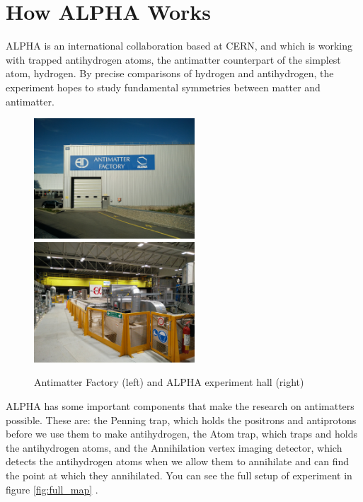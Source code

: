 \documentclass{article}
\begin{document}
\newpage

\tableofcontents

\newpage

\section{How ALPHA Works}

ALPHA is an international collaboration based at CERN, and which is working with trapped antihydrogen atoms, the antimatter counterpart of the simplest atom, hydrogen. By precise comparisons of hydrogen and antihydrogen, the experiment hopes to study fundamental symmetries between matter and antimatter. 

\begin{figure}[h]

\includegraphics[width=60mm]{antimatter_factory}
\includegraphics[width=60mm]{alpha_hall}

\caption{Antimatter Factory (left) and ALPHA experiment hall (right)}
\end{figure}

ALPHA has some important components that make the research on antimatters possible. These are: the Penning trap, which holds the positrons and antiprotons before we use them to make antihydrogen, the Atom trap, which traps and holds the antihydrogen atoms, and the Annihilation vertex imaging detector, which detects the antihydrogen atoms when we allow them to annihilate and can find the point at which they annihilated. You can see the full setup of experiment in figure \ref{fig:full_map} .
\end{document}
